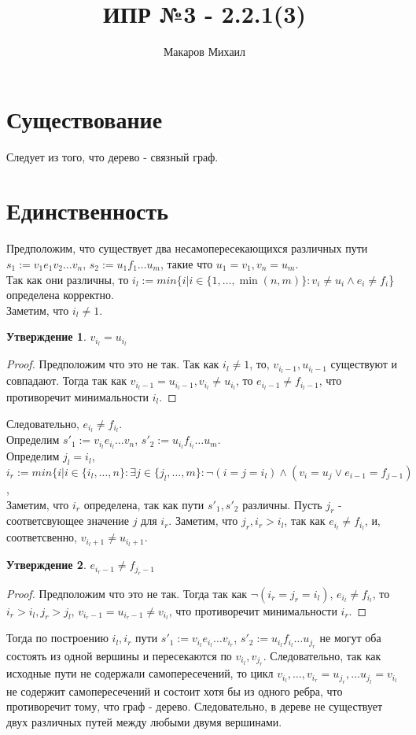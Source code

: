 \documentclass{article}
\title{ИПР №3 - 2.2.1(3)}
\author{Макаров Михаил}
\date{}
\newcommand{\range}[2]{
    \{#1, \ldots, #2 \}
}
\newtheorem{prop}{Утверждение}
\begin{document}
	\maketitle
	\section{Существование}
	Следует из того, что дерево - связный граф.
	\section{Единственность}
	Предположим, что существует два несамопересекающихся различных пути $s_1 := v_1e_1v_2\ldots v_n$,
	$s_2 := u_1f_1\ldots u_m$, такие что $u_1 = v_1, v_n = u_m$.\\
	Так как они различны, то
	$i_l := min\{i| i \in \range{1}{\min(n, m)}: v_i \neq u_i \wedge e_i \neq f_i$\} определена корректно.\\
	Заметим, что $i_l \neq 1$.
    \begin{prop} 
        $v_{i_l} = u_{i_l}$
    \end{prop}
    \begin{proof}
        Предположим что это не так. Так как $i_l \neq 1$, то, $v_{i_l - 1}, u_{i_l - 1}$ существуют 
        и совпадают. Тогда так как 
        $v_{i_l - 1} = u_{i_l - 1}, v_{i_l} \neq u_{i_l}$, то $e_{i_l - 1} \neq f_{i_l - 1}$, что противоречит
        минимальности $i_l$.
    \end{proof}
    Следовательно, $e_{i_l} \neq f_{i_l}$.\\
    Определим $s'_1 := v_{i_l}e_{i_l}\ldots v_n$, $s'_2 := u_{i_l}f_{i_l}\ldots u_m$.\\
    Определим $j_l = i_l$,
    $i_r := min\{i| i \in \range{i_l}{n}: \exists j \in \range{j_l}{m}: \neg(i = j = i_l) \land (v_i = u_j \lor e_{i - 1} = f_{j - 1})$,\\
    Заметим, что $i_r$ определена, так как пути $s'_1, s'_2$ различны.
    Пусть $j_r$ - соответсвующее значение $j$ для $i_r$.
    Заметим, что $j_r, i_r > i_l$, так как $e_{i_l} \neq f_{i_l}$, и, соответсвенно, $v_{i_l + 1} \neq u_{i_l + 1}$.
    \begin{prop} 
        $e_{i_r - 1} \neq f_{j_r - 1}$
    \end{prop}
    \begin{proof}
        Предположим что это не так. Тогда так как $\neg(i_r = j_r = i_l)$, $e_{i_l} \neq f_{i_l}$, то 
        $i_r > i_l, j_r > j_l$, $v_{i_r - 1} = u_{i_r - 1} \neq v_{i_l}$, что противоречит
        минимальности $i_r$.
    \end{proof}
    Тогда по построению $i_l, i_r$ пути $s'_1 := v_{i_l}e_{i_l}\ldots v_{i_r}$, $s'_2 := u_{i_l}f_{i_l}\ldots u_{j_r}$
    не могут оба состоять из одной вершины и пересекаются по $v_{i_l}, v_{j_r}$. Следовательно, так как исходные
    пути не содержали самопересечений, то цикл $v_{i_l},\ldots, v_{i_r} = u_{j_r}, \ldots u_{j_l} = v_{i_l}$ не 
    содержит самопересечений и состоит хотя бы из одного ребра, что противоречит тому, что граф - дерево.
    Следовательно, в дереве не существует двух различных путей между любыми двумя вершинами.
\end{document}
